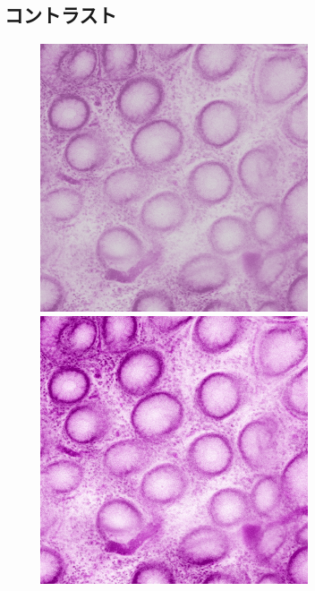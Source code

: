 \subsection*{コントラスト}
\begin{figure}[H]
	\centering

	\begin{minipage}{0.25\columnwidth}
		\centering
		\includegraphics[clip, width=\linewidth]{fig/preprocessing/data_aug/color/CONTRAST/CONTRAST_0_50}
	\end{minipage}
	\begin{minipage}{0.25\columnwidth}
		\centering
		\includegraphics[clip, width=\linewidth]{fig/preprocessing/data_aug/color/CONTRAST/CONTRAST_1_00}

\end{minipage}
\end{figure}
